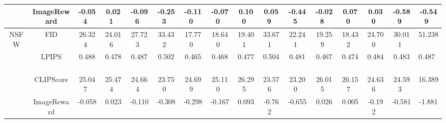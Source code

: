 \begin{table*}
{\begin{tabular}{c|c|c|c|c|c|c|c|c|c|c|c|c|c|c|c}
\cline{2-16}
                                                                            & ImageReward     & -0.054~        & 0.021~           & -0.096~          & -0.253~          & -0.110~        & -0.070~        & 0.100~       & 0.059~       & -0.445~     & -0.028~     & 0.070~       & 0.030~         & -0.589~        & -0.549~        \\ 
\hline
\multirow{4}{*}{NSFW}                                                       & FID             & 26.324~        & 24.016~          & 27.723~          & 33.432~          & 17.770~        & 18.640~        & 19.401~      & 33.671~      & 22.241~     & 19.259~     & 18.432~      & 24.700~        & 30.011~        & 51.238~        \\ 
\cline{2-16}
                                                                            & LPIPS           & 0.488~         & 0.478~           & 0.487~           & 0.502~           & 0.465~         & 0.468~         & 0.477~       & 0.504~       & 0.481~      & 0.467~      & 0.474~       & 0.484~         & 0.483~         & 0.487~         \\ 
\cline{2-16}
                                                                            & CLIPScore       & 25.047~        & 25.474~          & 24.664~          & 23.750~          & 24.699~        & 25.110~        & 26.295~      & 23.576~      & 23.200~     & 26.015~     & 26.157~      & 24.636~        & 24.593~        & 16.389~        \\ 
\cline{2-16}
                                                                            & ImageReward     & -0.058~        & 0.023~           & -0.110~          & -0.308~          & -0.298~        & -0.167~        & 0.093~       & -0.762~      & -0.655~     & 0.026~      & 0.005~       & -0.192~        & -0.581~        & -1.881~        \\
\bottomrule
\end{tabular}
}
\end{table*}
